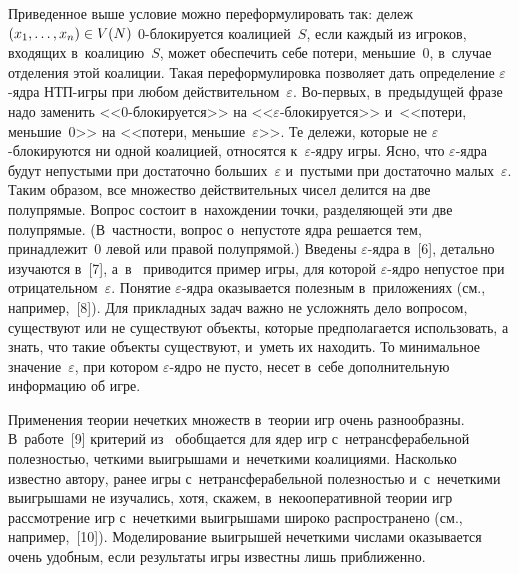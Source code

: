 \begin{multicols}{2}
Приведенное выше условие можно переформулировать так: дележ $(x_1, \ldots , 
x_n)\hm \in V(N)$ 0-бло\-ки\-ру\-ет\-ся коалицией~$S$, если каждый из игроков, 
входящих в~коалицию~$S$, может обеспечить себе потери, меньшие~0, 
в~случае отделения этой коалиции. Такая переформулировка позволяет дать 
определение $\varepsilon$-яд\-ра НТП-иг\-ры при 
любом действительном~$\varepsilon$. Во-пер\-вых, в~предыдущей фразе надо 
заменить <<0-бло\-ки\-ру\-ет\-ся>> на <<$\varepsilon$-бло\-ки\-ру\-ет\-ся>> 
и~<<потери, меньшие~0>> на <<потери, меньшие~$\varepsilon$>>. Те дележи, 
которые не $\varepsilon$-бло\-ки\-ру\-ют\-ся ни одной коалицией, относятся 
к~\mbox{$\varepsilon$-яд}\-ру игры. Ясно, что $\varepsilon$-яд\-ра будут непустыми при 
достаточно больших~$\varepsilon$ и~пустыми при достаточно 
малых~$\varepsilon$. Таким образом, все множество действительных чисел 
делится на две полупрямые. Вопрос состоит в~нахождении точки, разделяющей 
эти две полупрямые. (В~частности, вопрос о~непустоте ядра решается тем, 
принадлежит~0 левой или правой полупрямой.) Введены 
$\varepsilon$-яд\-ра в~[6], детально изучаются в~[7], а~в~\cite[с.~307]{7-sh} 
приводится пример игры, для которой $\varepsilon$-яд\-ро непустое при 
отрицательном~$\varepsilon$. Понятие $\varepsilon$-яд\-ра оказывается 
полезным в~приложениях (см., например,~[8]). Для прикладных задач важно не 
усложнять дело вопросом, существуют или не существуют объекты, которые 
предполагается использовать, а знать, что такие объекты существуют, и~уметь 
их находить. То минимальное значение~$\varepsilon$, при котором 
$\varepsilon$-яд\-ро не пусто, несет в~себе дополнительную информацию об 
игре.

     Применения теории нечетких множеств в~теории игр очень разнообразны. 
В~работе~[9] критерий из~\cite{5-sh} обобщается для ядер игр 
с~нетрансферабельной полезностью, четкими выигрышами и~нечеткими 
коалициями. Насколько известно автору, ранее игры с~нетрансферабельной 
полезностью и~с~нечеткими выигрышами не изучались, хотя, скажем, 
в~некооперативной теории игр рассмотрение игр с~нечеткими выигрышами 
широко распространено (см., например,~[10]). Моделирование выигрышей 
нечеткими числами оказывается очень удобным, если результаты игры 
известны лишь при\-бли\-женно.


\end{multicols}
